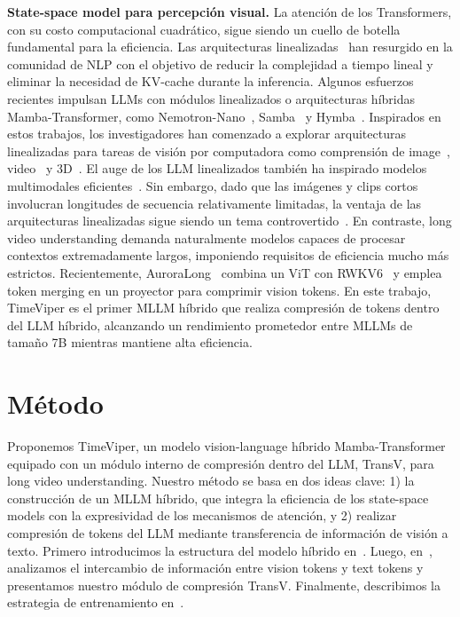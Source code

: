 \documentclass[10pt,twocolumn,letterpaper]{article}
\begin{document}
\noindent\textbf{State-space model para percepción visual.}
La atención de los Transformers, con su costo computacional cuadrático, sigue siendo un cuello de botella fundamental para la eficiencia.
Las arquitecturas linealizadas~\cite{peng2023rwkv,gu2024mamba} han resurgido en la comunidad de NLP con el objetivo de reducir la complejidad a tiempo lineal y eliminar la necesidad de KV-cache durante la inferencia.
Algunos esfuerzos recientes impulsan LLMs con módulos linealizados o arquitecturas híbridas Mamba-Transformer, como Nemotron-Nano~\cite{basant2025nanov2}, Samba~\cite{ren2025samba} y Hymba~\cite{dong2025hymba}.
Inspirados en estos trabajos, los investigadores han comenzado a explorar arquitecturas linealizadas para tareas de visión por computadora como comprensión de image~\cite{fan2024MALA,zhu2024visionmamba,yu2025mambaout}, video~\cite{li2024videomamba} y 3D~\cite{liu2025map}.
El auge de los LLM linealizados también ha inspirado modelos multimodales eficientes~\cite{zhao2025cobra,xu2025auroralong,ren2025vamba,qiao2024vlmamba,liao2025mmmamba,wang2024longllava}.
Sin embargo, dado que las imágenes y clips cortos involucran longitudes de secuencia relativamente limitadas, la ventaja de las arquitecturas linealizadas sigue siendo un tema controvertido~\cite{yu2025mambaout}.
En contraste, long video understanding demanda naturalmente modelos capaces de procesar contextos extremadamente largos, imponiendo requisitos de eficiencia mucho más estrictos.
Recientemente, AuroraLong~\cite{xu2025auroralong} combina un ViT con RWKV6~\cite{peng2024rwkv6} y emplea token merging en un proyector para comprimir vision tokens.
En este trabajo, TimeViper es el primer MLLM híbrido que realiza compresión de tokens dentro del LLM híbrido, alcanzando un rendimiento prometedor entre MLLMs de tamaño 7B mientras mantiene alta eficiencia.




\section{Método}
\label{sec:method}
Proponemos TimeViper, un modelo vision-language híbrido Mamba-Transformer equipado con un módulo interno de compresión dentro del LLM, TransV, para long video understanding. 
Nuestro método se basa en dos ideas clave: 
1) la construcción de un MLLM híbrido, que integra la eficiencia de los state-space models con la expresividad de los mecanismos de atención, y 
2) realizar compresión de tokens del LLM mediante transferencia de información de visión a texto. 
Primero introducimos la estructura del modelo híbrido en~. 
Luego, en~, analizamos el intercambio de información entre vision tokens y text tokens y presentamos nuestro módulo de compresión TransV. 
Finalmente, describimos la estrategia de entrenamiento en~.
\end{document}
